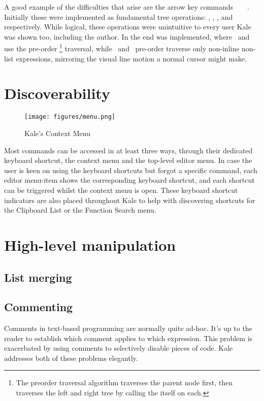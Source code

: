 A good example of the difficulties that arise are the arrow key
commands~\ak{^}~~\ak{<}~\ak{>}. Initially these were implemented as
fundamental tree operations: , ,
, and  respectively.
While logical, these operations were unintuitive to every user
Kale was shown too, including the author. In the end  was
implemented, where~\ak{<} and~\ak{>} use the pre-order%
%
\footnote{The preorder traversal algorithm traverses the parent node first,
then traverses the left and right tree by calling the itself on each.}
%
traversal, while~\ak{^} and~
pre-order traverse only non-inline non-list expressions, mirroring the visual
line motion a normal cursor might make.

\section{Discoverability}
\setlength\intextsep{0pt}
\begin{wrapfigure}[21]{R}{5.5cm}
\texttt{[image: figures/menu.png]}
\caption{Kale's Context Menu}
\end{wrapfigure}
Most commands can be accessed in at least three ways, through their dedicated
keyboard shortcut, the context menu and the top-level editor menu. In case the
user is keen on using the keyboard shortcuts but forgot a specific command,
each editor menu-item shows the corresponding keyboard shortcut, and each
shortcut can be triggered whilst the context menu is open. These keyboard
shortcut indicators are also placed throughout Kale to help with discovering
shortcuts for the Clipboard List or the Function Search menu.


\section{High-level manipulation}

\subsection{List merging}

\subsection{Commenting}
Comments in text-based programming are normally quite ad-hoc. It's up to the
reader to establish which comment applies to which expression. This problem
is exacerbated by using comments to selectively disable pieces of code. Kale
addresses both of these problems elegantly.

